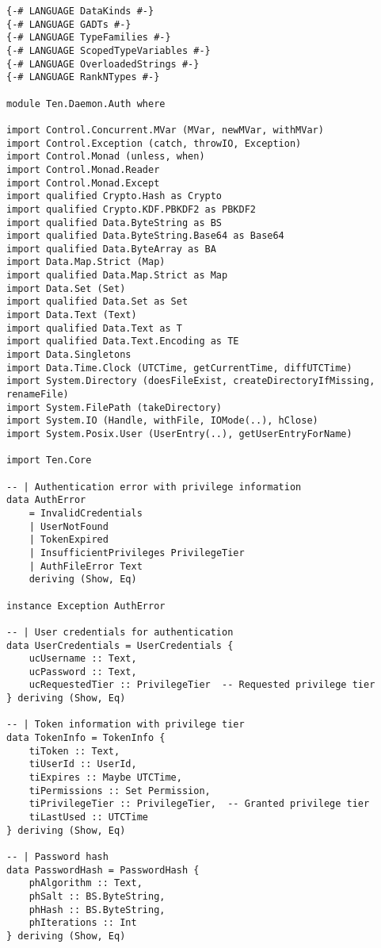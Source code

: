 \documentclass{article}
\begin{document}
\begin{tcolorbox}[title=Ten/Daemon/Auth.hs Changes]
\begin{verbatim}
{-# LANGUAGE DataKinds #-}
{-# LANGUAGE GADTs #-}
{-# LANGUAGE TypeFamilies #-}
{-# LANGUAGE ScopedTypeVariables #-}
{-# LANGUAGE OverloadedStrings #-}
{-# LANGUAGE RankNTypes #-}

module Ten.Daemon.Auth where

import Control.Concurrent.MVar (MVar, newMVar, withMVar)
import Control.Exception (catch, throwIO, Exception)
import Control.Monad (unless, when)
import Control.Monad.Reader
import Control.Monad.Except
import qualified Crypto.Hash as Crypto
import qualified Crypto.KDF.PBKDF2 as PBKDF2
import qualified Data.ByteString as BS
import qualified Data.ByteString.Base64 as Base64
import qualified Data.ByteArray as BA
import Data.Map.Strict (Map)
import qualified Data.Map.Strict as Map
import Data.Set (Set)
import qualified Data.Set as Set
import Data.Text (Text)
import qualified Data.Text as T
import qualified Data.Text.Encoding as TE
import Data.Singletons
import Data.Time.Clock (UTCTime, getCurrentTime, diffUTCTime)
import System.Directory (doesFileExist, createDirectoryIfMissing, renameFile)
import System.FilePath (takeDirectory)
import System.IO (Handle, withFile, IOMode(..), hClose)
import System.Posix.User (UserEntry(..), getUserEntryForName)

import Ten.Core

-- | Authentication error with privilege information
data AuthError
    = InvalidCredentials
    | UserNotFound
    | TokenExpired
    | InsufficientPrivileges PrivilegeTier
    | AuthFileError Text
    deriving (Show, Eq)

instance Exception AuthError

-- | User credentials for authentication
data UserCredentials = UserCredentials {
    ucUsername :: Text,
    ucPassword :: Text,
    ucRequestedTier :: PrivilegeTier  -- Requested privilege tier
} deriving (Show, Eq)

-- | Token information with privilege tier
data TokenInfo = TokenInfo {
    tiToken :: Text,
    tiUserId :: UserId,
    tiExpires :: Maybe UTCTime,
    tiPermissions :: Set Permission,
    tiPrivilegeTier :: PrivilegeTier,  -- Granted privilege tier
    tiLastUsed :: UTCTime
} deriving (Show, Eq)

-- | Password hash
data PasswordHash = PasswordHash {
    phAlgorithm :: Text,
    phSalt :: BS.ByteString,
    phHash :: BS.ByteString,
    phIterations :: Int
} deriving (Show, Eq)


\end{verbatim}
\end{tcolorbox}
\end{document}
